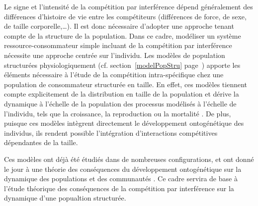 Le signe et l'intensité de la compétition par interférence dépend généralement
des différences d'histoire de vie entre les compétiteurs (différences de force,
de sexe, de taille corporelle,\ldots). Il est donc nécessaire d'adopter une
approche tenant compte de la structure de la population. Dans ce cadre,
modéliser un système ressource-consommateur simple incluant de la compétition
par interférence nécessite une approche centrée sur l'individu. Les modèles de
population structurées physiologiquement (cf.
section~\ref{modelPopStru} page~\pageref{modelPopStru}) apporte les éléments
nécessaire à l'étude de la compétition intra-spécifique chez une population de
consommateur structurée en taille. En effet, ces modèles tiennent compte
explicitement de la distribution en taille de la population et dérive la
dynamique à l'échelle de la population des processus modélisés à l'échelle de
l'individu, tels que la croissance, la reproduction ou la mortalité
\autocites{kooijman1984a, metz1986a, de-roos1997a}. De plus, puisque ces modèles
intègrent directement le développement ontogénétique des individus, ils rendent
possible l'intégration d'interactions compétitives dépendantes de la taille.

Ces modèles ont déjà été
étudiés dans de nombreuses configurations, et ont donné le jour à une théorie
des conséquences du développement ontogénétique sur la dynamique des populations
et des communautés \autocites{de-roos2012a}. Ce cadre servira de base
à l'étude théorique des conséquences de la compétition par interférence sur la
dynamique d'une popualtion structurée. 
